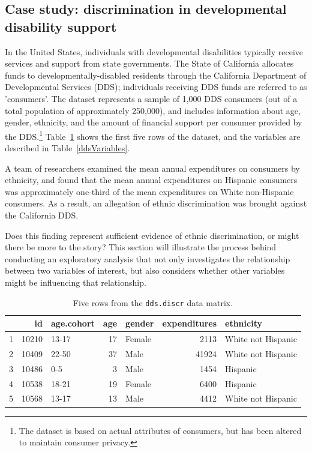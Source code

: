 \subsection{Case study: discrimination in developmental disability support}
\label{caseStudyDiscrimination}

In the United States, individuals with developmental disabilities typically receive services and support from state governments. The State of California allocates funds to developmentally-disabled residents through the California Department of Developmental Services (DDS); individuals receiving DDS funds are referred to as 'consumers'. The dataset  represents a sample of 1,000 DDS consumers (out of a total population of approximately 250,000), and includes information about age, gender, ethnicity, and the amount of financial support per consumer provided by the DDS.\footnote{The dataset is based on actual attributes of consumers, but has been altered to maintain consumer privacy.} Table~\ref{ddsDiscrDF} shows the first five rows of the dataset, and the variables are described in Table~\ref{ddsVariables}.

A team of researchers examined the mean annual expenditures on consumers by ethnicity, and found that the mean annual expenditures on Hispanic consumers was approximately one-third of the mean expenditures on White non-Hispanic consumers. As a result, an allegation of ethnic discrimination was brought against the California DDS. 

Does this finding represent sufficient evidence of ethnic discrimination, or might there be more to the story? This section will illustrate the process behind conducting an exploratory analysis that not only investigates the relationship between two variables of interest, but also considers whether other variables might be influencing that relationship.

\begin{table}[ht]
	\centering
	\begin{tabular}{rrlrlrl}
		\hline
		& id & age.cohort & age & gender & expenditures & ethnicity \\ 
		\hline
		1 & 10210 & 13-17 &  17 & Female & 2113 & White not Hispanic \\ 
		2 & 10409 & 22-50 &  37 & Male & 41924 & White not Hispanic \\ 
		3 & 10486 & 0-5 &   3 & Male & 1454 & Hispanic \\ 
		4 & 10538 & 18-21 &  19 & Female & 6400 & Hispanic \\ 
		5 & 10568 & 13-17 &  13 & Male & 4412 & White not Hispanic \\ 
		\hline
	\end{tabular}
	\caption{Five rows from the \texttt{dds.discr} data matrix.} 
	\label{ddsDiscrDF}
\end{table}

